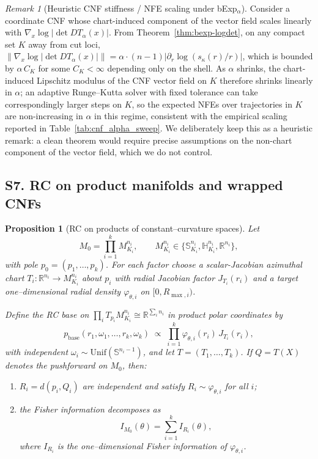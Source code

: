 \documentclass{article}
\newtheorem{proposition}{Proposition}
\theoremstyle{definition}
\theoremstyle{remark}
\newtheorem{remark}{Remark}
\newcommand{\SSS}{\mathbb{S}}
\newcommand{\HH}{\mathbb{H}}
\begin{document}
\begin{remark}[Heuristic CNF stiffness / NFE scaling under bExp$_\alpha$]
\label{rem:cnf}
Consider a coordinate CNF whose chart-induced component of the vector field
scales linearly with $\nabla_x\log|\det DT_\alpha(x)|$. From
Theorem~\ref{thm:bexp-logdet}, on any compact set $K$ away from cut loci,
$\|\nabla_x\log|\det DT_\alpha(x)|\|=\alpha\cdot(n-1)|\partial_r\log(s_\kappa(r)/r)|$,
which is bounded by $\alpha\,C_K$ for some $C_K<\infty$ depending only on the
shell. As $\alpha$ shrinks, the chart-induced Lipschitz modulus of the CNF
vector field on $K$ therefore shrinks linearly in $\alpha$; an adaptive
Runge--Kutta solver with fixed tolerance can take correspondingly larger steps
on $K$, so the expected NFEs over trajectories in $K$ are non-increasing in
$\alpha$ in this regime, consistent with the empirical scaling reported in
Table~\ref{tab:cnf_alpha_sweep}. We deliberately keep this as a heuristic
remark: a clean theorem would require precise assumptions on the non-chart
component of the vector field, which we do not control.
\end{remark}
\subsection*{S7. RC on product manifolds and wrapped CNFs}

\begin{proposition}[RC on products of constant--curvature spaces]
Let
\[
M_0=\prod_{i=1}^k M^{n_i}_{K_i},
\qquad
M^{n_i}_{K_i}\in\{\SSS^{n_i}_{K_i},\HH^{n_i}_{K_i},\mathbb R^{n_i}\},
\]
with pole $p_0=(p_1,\dots,p_k)$. For each factor choose a scalar-Jacobian azimuthal chart
$T_i:\mathbb R^{n_i}\to M^{n_i}_{K_i}$ about $p_i$ with radial Jacobian factor $J_{T_i}(r_i)$ and a
target one--dimensional radial density $\varphi_{\theta,i}$ on $[0,R_{\max,i})$.

Define the RC base on $\prod_i T_{p_i}M^{n_i}_{K_i}\cong\mathbb R^{\sum_i n_i}$ in product polar
coordinates by
\[
p_{\mathrm{base}}(r_1,\omega_1,\dots,r_k,\omega_k)
\;\propto\;
\prod_{i=1}^k \varphi_{\theta,i}(r_i)\,J_{T_i}(r_i),
\]
with independent $\omega_i\sim\mathrm{Unif}(\SSS^{n_i-1})$, and let $T=(T_1,\dots,T_k)$. If
$Q=T(X)$ denotes the pushforward on $M_0$, then:
\begin{enumerate}
\item $R_i=d(p_i,Q_i)$ are independent and satisfy $R_i\sim\varphi_{\theta,i}$ for all $i$;
\item the Fisher information decomposes as
\[
I_{M_0}(\theta)=\sum_{i=1}^k I_{R_i}(\theta),
\]
where $I_{R_i}$ is the one--dimensional Fisher information of $\varphi_{\theta,i}$.
\end{enumerate}
\end{proposition}
\end{document}
